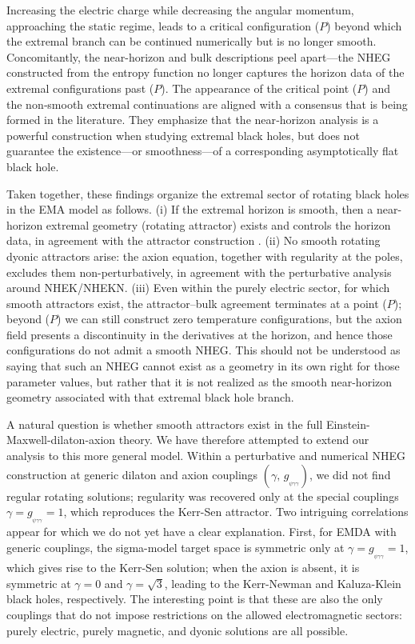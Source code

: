 \documentclass[11pt]{article}
\numberwithin{equation}{section} %
\begin{document}
Increasing the electric charge while decreasing the angular momentum, approaching the static regime, leads to a critical configuration ($P$) beyond which the extremal branch can be continued numerically but is no longer smooth. Concomitantly, the near-horizon and bulk descriptions peel apart—the NHEG constructed from the entropy function no longer captures the horizon data of the extremal configurations past ($P$). The appearance of the critical point ($P$) and the non‑smooth extremal continuations are aligned with a consensus that is being formed in the literature. They emphasize that the near‑horizon analysis is a powerful construction when studying extremal black holes, but does not guarantee the existence—or smoothness—of a corresponding asymptotically flat black hole. 


Taken together, these findings organize the extremal sector  {of rotating black holes in the EMA model}  as follows. (i) If the extremal horizon is smooth, then a   {near-horizon}  extremal geometry (rotating attractor) exists  {\cite{Kunduri:2007vf,Kunduri:2013gce}}  and controls the horizon data{, in agreement with the attractor construction \cite{Astefanesei:2006dd,Astefanesei:2007bf,Sen:2005iz}}. (ii) No smooth rotating dyonic attractors arise: the axion equation, together with regularity at the poles, excludes them non-perturbatively, in agreement with the perturbative analysis around NHEK/NHEKN. (iii) Even within the   {purely}  electric sector,   {for which smooth attractors exist, the attractor--bulk}  agreement terminates at a point ($P$); beyond ($P$) we can still construct zero  temperature configurations, but the axion field presents a discontinuity in the derivatives   {at the horizon, and hence those configurations do not admit a smooth NHEG. This should not be understood as saying that such an NHEG cannot exist as a geometry in its own right for those parameter values, but rather that it is not realized as the smooth near-horizon geometry associated with that extremal black hole branch}.


A natural question is whether smooth attractors exist in the full Einstein-Maxwell-dilaton-axion theory. We have therefore attempted to extend our analysis to this more general model. Within a perturbative and numerical NHEG construction at generic dilaton and axion couplings $(\gamma,\,g_{_{\psi\gamma\gamma}})$, we did not find regular rotating solutions; regularity was recovered only at the special couplings $\gamma=g_{_{\psi\gamma\gamma}}=1$, which reproduces the Kerr-Sen attractor.  Two intriguing correlations appear for which we do not yet have a clear explanation. First, for EMDA with generic couplings, the sigma-model target space is symmetric only at $\gamma=g_{_{\psi\gamma\gamma}}=1$, which gives rise to the Kerr-Sen solution; when the axion is absent, it is symmetric at $\gamma=0$ and $\gamma=\sqrt{3}$, leading to the Kerr-Newman and Kaluza-Klein black holes, respectively. The interesting point is that these are also the only couplings that do not impose restrictions on the allowed electromagnetic sectors: purely electric, purely magnetic, and dyonic solutions are all possible.
\end{document}
